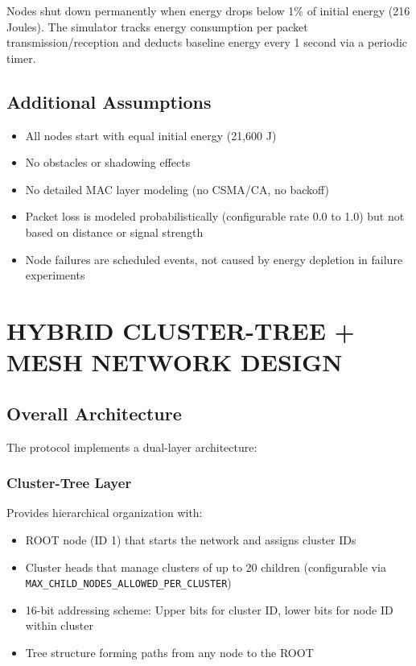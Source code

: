 \documentclass[conference]{IEEEtran}
\begin{document}
Nodes shut down permanently when energy drops below 1\% of initial energy (216 Joules). The simulator tracks energy consumption per packet transmission/reception and deducts baseline energy every 1 second via a periodic timer.

\subsection{Additional Assumptions}
\begin{itemize}
    \item All nodes start with equal initial energy (21,600 J)
    \item No obstacles or shadowing effects
    \item No detailed MAC layer modeling (no CSMA/CA, no backoff)
    \item Packet loss is modeled probabilistically (configurable rate 0.0 to 1.0) but not based on distance or signal strength
    \item Node failures are scheduled events, not caused by energy depletion in failure experiments
\end{itemize}

\section{HYBRID CLUSTER-TREE + MESH NETWORK DESIGN}

\subsection{Overall Architecture}

The protocol implements a dual-layer architecture:

\subsubsection{Cluster-Tree Layer}
Provides hierarchical organization with:
\begin{itemize}
    \item ROOT node (ID 1) that starts the network and assigns cluster IDs
    \item Cluster heads that manage clusters of up to 20 children (configurable via \texttt{MAX\_CHILD\_NODES\_ALLOWED\_PER\_CLUSTER})
    \item 16-bit addressing scheme: Upper bits for cluster ID, lower bits for node ID within cluster
    \item Tree structure forming paths from any node to the ROOT
\end{itemize}
\end{document}

